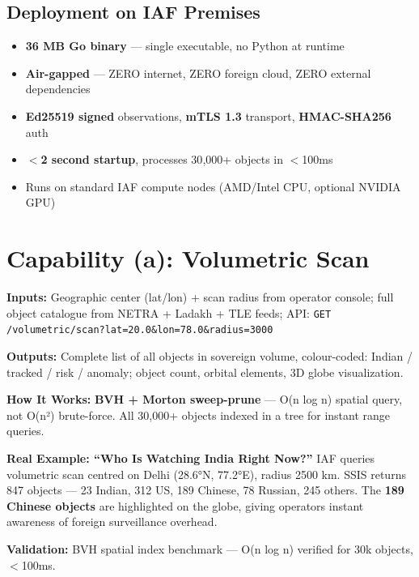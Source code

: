 \documentclass[11pt,a4paper]{article}
\begin{document}
\subsection{Deployment on IAF Premises}
\begin{itemize}[noitemsep]
  \item \textbf{36 MB Go binary} --- single executable, no Python at runtime
  \item \textbf{Air-gapped} --- ZERO internet, ZERO foreign cloud, ZERO external dependencies
  \item \textbf{Ed25519 signed} observations, \textbf{mTLS 1.3} transport, \textbf{HMAC-SHA256} auth
  \item \textbf{$<$2 second startup}, processes 30{,}000+ objects in $<$100ms
  \item Runs on standard IAF compute nodes (AMD/Intel CPU, optional NVIDIA GPU)
\end{itemize}

\newpage
\section{Capability (a): Volumetric Scan}

\textbf{Inputs:} Geographic center (lat/lon) + scan radius from operator console; full object catalogue from NETRA + Ladakh + TLE feeds; API: \texttt{GET /volumetric/scan?lat=20.0\&lon=78.0\&radius=3000}

\textbf{Outputs:} Complete list of all objects in sovereign volume, colour-coded: Indian / tracked / risk / anomaly; object count, orbital elements, 3D globe visualization.

\textbf{How It Works:} \textbf{BVH + Morton sweep-prune} --- O(n log n) spatial query, not O(n²) brute-force. All 30{,}000+ objects indexed in a tree for instant range queries.

\textbf{Real Example: ``Who Is Watching India Right Now?''} IAF queries volumetric scan centred on Delhi (28.6°N, 77.2°E), radius 2500 km. SSIS returns 847 objects --- 23 Indian, 312 US, 189 Chinese, 78 Russian, 245 others. The \textbf{189 Chinese objects} are highlighted on the globe, giving operators instant awareness of foreign surveillance overhead.

\textbf{Validation:} BVH spatial index benchmark --- O(n log n) verified for 30k objects, $<$100ms.

\end{document}
